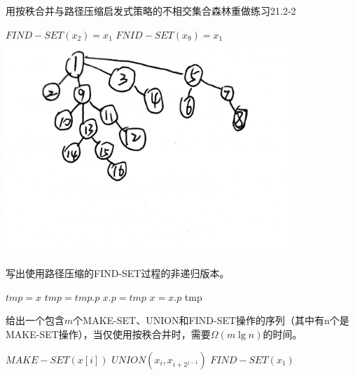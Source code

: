 \documentclass[a4paper, justified]{tufte-handout}
\begin{document}
\begin{problem}[TC 21.3-1]
用按秩合并与路径压缩启发式策略的不相交集合森林重做练习21.2-2
\end{problem}

\begin{solution}
  $FIND-SET(x_2) = x_1$
  $FNID-SET(x_9) = x_1$
  \includegraphics[width = 0.8\textwidth]{tree.jpg}
\end{solution}

\begin{problem}[TC 21.3-2]
写出使用路径压缩的FIND-SET过程的非递归版本。
\end{problem}

\begin{solution}
  \begin{algorithm}[H]
    \begin{algorithmic}[1]
      \State $tmp = x$
      \State $tmp = tmp.p$
      \EndWhile
      \State $x.p = tmp$
      \State $x = x.p$
      \EndWhile
      \State \Return tmp
      \EndFunction
    \end{algorithmic}
  \end{algorithm}
\end{solution}

\begin{problem}[TC 21.3-3]
给出一个包含$m$个MAKE-SET、UNION和FIND-SET操作的序列（其中有n个是MAKE-SET操作），当仅使用按秩合并时，需要$\Omega(m\lg n)$的时间。
\end{problem}

\begin{solution}
  \begin{algorithm}[H]
    \begin{algorithmic}[1]
      \State $MAKE-SET(x[i])$
      \EndFor
      \State $UNION(x_i, x_{i+2^{j-1}})$
      \EndFor
      \EndFor
      \State $FIND-SET(x_1)$
      \EndFor
      \EndProcedure
    \end{algorithmic}
  \end{algorithm}
\end{solution}
\beginoptional
\end{document}
